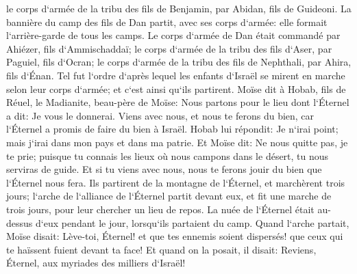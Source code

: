 \verse le corps d`armée de la tribu des fils de Benjamin, par Abidan, fils de Guideoni. 
\verse La bannière du camp des fils de Dan partit, avec ses corps d`armée: elle formait l`arrière-garde de tous les camps. Le corps d`armée de Dan était commandé par Ahiézer, fils d`Ammischaddaï; 
\verse le corps d`armée de la tribu des fils d`Aser, par Paguiel, fils d`Ocran; 
\verse le corps d`armée de la tribu des fils de Nephthali, par Ahira, fils d`Énan. 
\verse Tel fut l`ordre d`après lequel les enfants d`Israël se mirent en marche selon leur corps d`armée; et c`est ainsi qu`ils partirent. 
\verse Moïse dit à Hobab, fils de Réuel, le Madianite, beau-père de Moïse: Nous partons pour le lieu dont l`Éternel a dit: Je vous le donnerai. Viens avec nous, et nous te ferons du bien, car l`Éternel a promis de faire du bien à Israël. 
\verse Hobab lui répondit: Je n`irai point; mais j`irai dans mon pays et dans ma patrie. 
\verse Et Moïse dit: Ne nous quitte pas, je te prie; puisque tu connais les lieux où nous campons dans le désert, tu nous serviras de guide. 
\verse Et si tu viens avec nous, nous te ferons jouir du bien que l`Éternel nous fera. 
\verse Ils partirent de la montagne de l`Éternel, et marchèrent trois jours; l`arche de l`alliance de l`Éternel partit devant eux, et fit une marche de trois jours, pour leur chercher un lieu de repos. 
\verse La nuée de l`Éternel était au-dessus d`eux pendant le jour, lorsqu`ils partaient du camp. 
\verse Quand l`arche partait, Moïse disait: Lève-toi, Éternel! et que tes ennemis soient dispersés! que ceux qui te haïssent fuient devant ta face! 
\verse Et quand on la posait, il disait: Reviens, Éternel, aux myriades des milliers d`Israël! 


